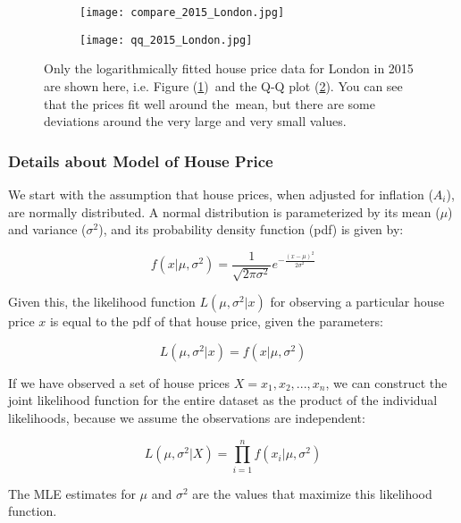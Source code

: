 \documentclass[12pt]{article}  %
\begin{document}
\begin{figure}[htbp]
    \centering
    \begin{subfigure}[b]{.5\textwidth}
        \texttt{[image: compare\_2015\_London.jpg]}
        \caption{}\label{subfig:hist}
    \end{subfigure}
    \begin{subfigure}[b]{.4\textwidth}
        \texttt{[image: qq\_2015\_London.jpg]}
        \caption{}\label{subfig:qq}
    \end{subfigure}
    \caption{Only the logarithmically fitted house price data for London in 2015 are shown here, i.e. Figure (\ref{subfig:hist})\
    and the Q-Q plot (\ref{subfig:qq}). You can see that the prices fit well around the\
    mean, but there are some deviations around the very large and very small values.
    }\label{fig:qq}
\end{figure}

\subsubsection{Details about Model of House Price}
We start with the assumption that house prices, when adjusted for inflation ($A_i$), are normally distributed. A normal distribution is parameterized by its mean ($\mu$) and variance ($\sigma^2$), and its probability density function (pdf) is given by:

\begin{equation}
f(x|\mu, \sigma^2)=\frac{1}{\sqrt{2\pi\sigma^2}} e^{-\frac{(x-\mu)^2}{2\sigma^2}}
\end{equation}

Given this, the likelihood function $L(\mu, \sigma^2|x)$ for observing a particular house price $x$ is equal to the pdf of that house price, given the parameters:

\begin{equation}
L(\mu, \sigma^2|x)=f(x|\mu, \sigma^2)
\end{equation}

If we have observed a set of house prices $X={x_1, x_2, ..., x_n}$, we can construct the joint likelihood function for the entire dataset as the product of the individual likelihoods, because we assume the observations are independent:

\begin{equation}
L(\mu, \sigma^2|X)=\prod_{i=1}^{n} f(x_i|\mu, \sigma^2)
\end{equation}

The MLE estimates for $\mu$ and $\sigma^2$ are the values that maximize this likelihood function.
\end{document}
